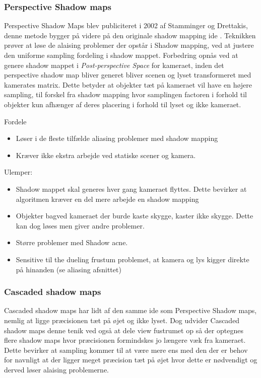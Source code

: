 \documentclass[11pt,a4paper]{article}
\begin{document}
\subsubsection{Perspective Shadow maps}

Perspective Shadow Maps \cite{PSMAP} blev publiciteret i 2002 af Stamminger og Drettakis, denne metode bygger på videre på den originale shadow mapping ide \cite{SMAP}. Teknikken prøver at løse de alaising problemer der opstår i Shadow mapping, ved at justere den uniforme sampling fordeling i shadow mappet. Forbedring opnås ved at genere shadow mappet i \textit{Post-perspective Space} for kameraet, inden det perspective shadow map bliver generet bliver scenen og lyset transformeret med kamerates matrix. Dette betyder at objekter tæt på kameraet vil have en højere sampling, til forskel fra shadow mapping hvor samplingen factoren i forhold til objekter kun afhænger af deres placering i forhold til lyset og ikke kameraet.


Fordele
\begin{itemize}
  \item Løser i de fleste tilfælde aliasing problemer med shadow mapping
  \item Kræver ikke ekstra arbejde ved statiske scener og kamera.
\end{itemize}

Ulemper:
\begin{itemize}
  \item Shadow mappet skal generes  hver gang kameraet flyttes. Dette bevirker at algoritmen kræver en del mere arbejde en shadow mapping
  \item Objekter bagved kameraet der burde kaste skygge, kaster ikke skygge. Dette kan dog løses men giver andre problemer.
  \item Større problemer med Shadow acne.
  \item	Sensitive til the dueling frustum problemet, at kamera og lys kigger direkte på hinanden (se aliasing afsnittet)
\end{itemize}

\subsubsection{Cascaded shadow maps}

Cascaded shadow maps har lidt af den samme ide som Perspective Shadow maps, nemlig at ligge præcisionen tæt på øjet og ikke lyset. Dog udvider Cascaded shadow maps denne tenik ved også at dele view fustrumet op så der optegnes flere shadow maps hvor præcisionen formindskes jo længere væk fra kameraet.  Dette bevirker at sampling kommer til at være mere ens med den der er behov for navnligt at der ligger meget præcision tæt på øjet hvor dette er nødvendigt og derved løser alaising problemerne.
\end{document}
